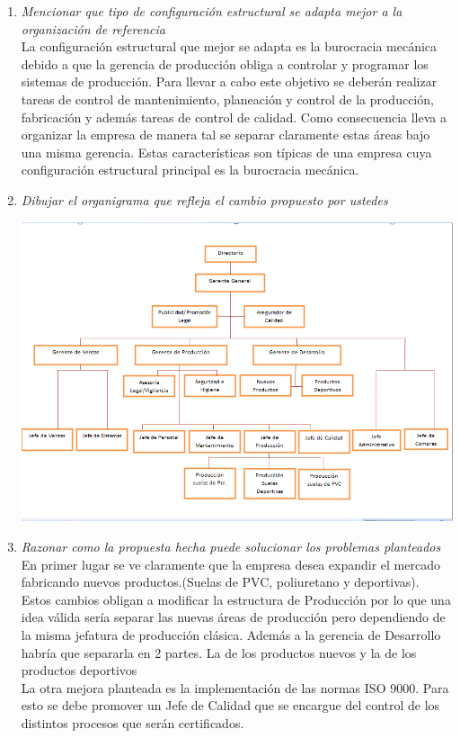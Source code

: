 \documentclass[a4paper,10pt]{article}
\begin{document}
\begin{enumerate}
			\item \textit{Mencionar que tipo de configuración estructural se adapta mejor a la organización de referencia}\\
			La configuración estructural que mejor se adapta es la burocracia mecánica debido a que la gerencia de producción obliga a controlar y programar los sistemas de producción. Para llevar a cabo este objetivo se deberán realizar tareas de control de mantenimiento, planeación y control de la producción, fabricación y además tareas de control de calidad. Como consecuencia lleva a organizar la empresa de manera tal se separar claramente estas áreas bajo una misma gerencia. Estas características son típicas de una empresa cuya configuración estructural principal es la burocracia mecánica.\\

						
			\item \textit{Dibujar el organigrama que refleja el cambio propuesto por ustedes}
		
			
				\includegraphics[width=1\textwidth]{imagenes/SolucionPropuestaGringo.png}
				
				
				
						
			\item \textit{Razonar como la propuesta hecha puede solucionar los problemas planteados}\\
			
			En primer lugar se ve claramente que la empresa desea expandir el mercado fabricando nuevos productos.(Suelas de PVC, poliuretano y deportivas). Estos cambios obligan a modificar la estructura de Producción por lo que una idea válida sería separar las nuevas áreas de producción pero dependiendo de la misma jefatura de producción clásica. Además a la gerencia de Desarrollo habría que separarla en 2 partes. La de los productos nuevos y la de los productos deportivos\\
			La otra mejora planteada es la implementación de las normas ISO 9000. Para esto se debe promover un Jefe de Calidad que se encargue del control de los distintos procesos que serán certificados.\\ 
			

			
			\end{enumerate}
		
\end{document}
